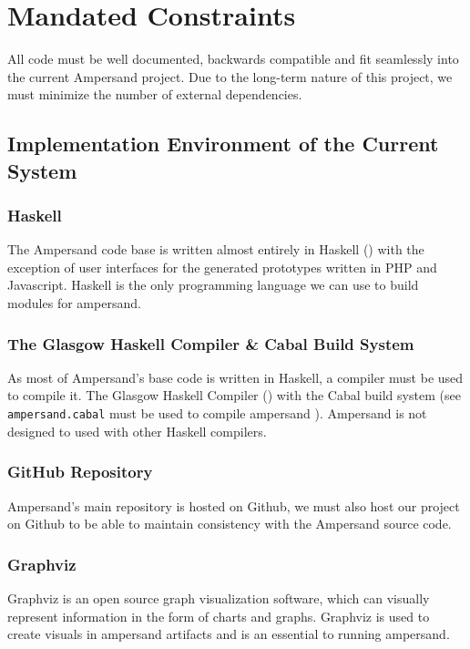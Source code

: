 \documentclass[12pt]{report}
\begin{document}
\section{Mandated Constraints}\label{sec:Constraints}

All code must be well documented, backwards compatible and fit seamlessly into 
the current Ampersand project. Due to the long-term nature of this project, we 
must minimize the number of external dependencies. 

\subsection{Implementation Environment of the Current System}
\subsubsection*{Haskell}
The Ampersand code base is written almost entirely in Haskell 
(\cite{ampSource}) with the exception of user interfaces for the generated 
prototypes written in PHP and Javascript. Haskell is the only programming 
language we can use to build modules for ampersand.


\subsubsection*{The Glasgow Haskell Compiler \& Cabal Build System}
As most of Ampersand's base code is written in Haskell, a compiler must be used 
to compile it. The Glasgow Haskell Compiler (\cite{GHC}) with the Cabal build 
system (see \verb|ampersand.cabal| must be used to compile ampersand 
\cite{ampSource}). Ampersand is not designed to used with other Haskell 
compilers.


\subsubsection*{GitHub Repository}
Ampersand's main repository is hosted on Github, we must also host our project 
on Github to be able to maintain consistency with the Ampersand source code.

\subsubsection*{Graphviz}
Graphviz is an open source graph visualization software, which can
visually represent information in the form of charts and graphs. Graphviz is 
used to create visuals in ampersand artifacts and is an essential to running 
ampersand.
\end{document}
